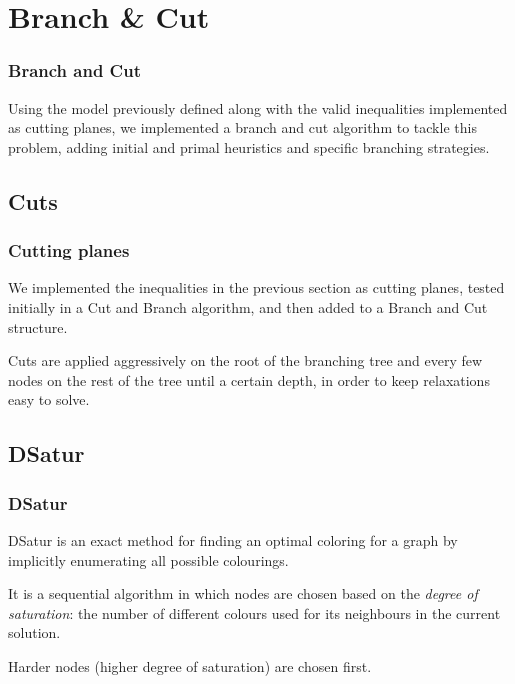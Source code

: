 \documentclass{beamer}
\begin{document}
\section{Branch \& Cut}

\begin{frame}
\frametitle{Branch and Cut}

Using the model previously defined along with the valid inequalities implemented as cutting planes, we implemented a branch and cut algorithm to tackle this problem, adding initial and primal heuristics and specific branching strategies.

\end{frame} 

\subsection{Cuts}

\begin{frame}
\frametitle{Cutting planes}

We implemented the inequalities in the previous section as cutting planes, tested initially in a Cut and Branch algorithm, and then added to a Branch and Cut structure.

Cuts are applied aggressively on the root of the branching tree and every few nodes on the rest of the tree until a certain depth, in order to keep relaxations easy to solve.

\end{frame}

\subsection{DSatur}
\begin{frame}
\frametitle{DSatur}

DSatur is an exact method for finding an optimal coloring for a graph by implicitly enumerating all possible colourings.

It is a sequential algorithm in which nodes are chosen based on the \textit{degree of saturation}: the number of different colours used for its neighbours in the current solution. 

Harder nodes (higher 
degree of saturation) are chosen first.

\end{frame} 
\end{document}
